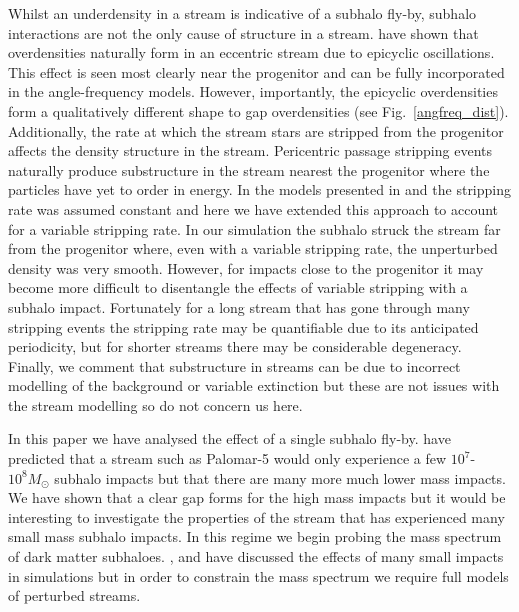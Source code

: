 \documentclass[useAMS,usenatbib,fleqn,a4paper]{mn2e}
\begin{document}
Whilst an underdensity in a stream is indicative of a subhalo fly-by, subhalo interactions are not the only cause of structure in a stream. \cite{Kuepper2010} have shown that overdensities naturally form in an eccentric stream due to epicyclic oscillations. This effect is seen most clearly near the progenitor and can be fully incorporated in the angle-frequency models. However, importantly, the epicyclic overdensities form a qualitatively different shape to gap overdensities (see Fig.~\ref{angfreq_dist}). Additionally, the rate at which the stream stars are stripped from the progenitor affects the density structure in the stream. Pericentric passage stripping events naturally produce substructure in the stream nearest the progenitor where the particles have yet to order in energy. In the models presented in \cite{Bovy2014} and \cite{Sanders2014} the stripping rate was assumed constant and here we have extended this approach to account for a variable stripping rate. In our simulation the subhalo struck the stream far from the progenitor where, even with a variable stripping rate, the unperturbed density was very smooth. However, for impacts close to the progenitor it may become more difficult to disentangle the effects of variable stripping with a subhalo impact. Fortunately for a long stream that has gone through many stripping events the stripping rate may be quantifiable due to its anticipated periodicity, but for shorter streams there may be considerable degeneracy. Finally, we comment that substructure in streams can be due to incorrect modelling of the background or variable extinction but these are not issues with the stream modelling so do not concern us here.

In this paper we have analysed the effect of a single subhalo fly-by. \cite{YoonJohnstonHogg} have predicted that a stream such as Palomar-5 would only experience a few $10^7$-$10^8M_\odot$ subhalo impacts but that there are many more much lower mass impacts. We have shown that a clear gap forms for the high mass impacts but it would be interesting to investigate the properties of the stream that has experienced many small mass subhalo impacts. In this regime we begin probing the mass spectrum of dark matter subhaloes. \citet{CarlbergGD12013},\citet{NganCarlberg2014} and \citet{ngan_etal_2015} have discussed the effects of many small impacts in simulations but in order to constrain the mass spectrum we require full models of perturbed streams.
\end{document}
